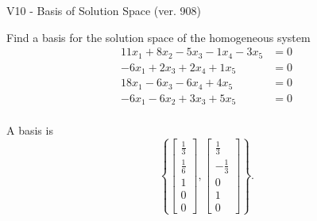 \begin{exercise}
  \begin{exerciseTitle}V10 - Basis of Solution Space (ver. 908)\end{exerciseTitle}
  \begin{exerciseStatement}
    Find a basis for the solution space of the homogeneous system 
\begin{align*}
 11 x_ 1 + 8 x_ 2 -5 x_ 3 -1 x_ 4 -3 x_ 5 &= 0  \\ 
  -6 x_ 1 + 2 x_ 3 + 2 x_ 4 + 1 x_ 5 &= 0  \\ 
  18 x_ 1 -6 x_ 3 -6 x_ 4 + 4 x_ 5 &= 0  \\ 
  -6 x_ 1 -6 x_ 2 + 3 x_ 3 + 5 x_ 5 &= 0  \\ 
 \end{align*}


 
  \end{exerciseStatement}

  \begin{exerciseAnswer}
   A basis is   
\[\left\{\left[\begin{array}{c}
\frac{1}{3} \\
\frac{1}{6} \\
1 \\
0 \\
0
\end{array}\right] , \left[\begin{array}{c}
\frac{1}{3} \\
-\frac{1}{3} \\
0 \\
1 \\
0
\end{array}\right]\right\}.\]

  


  \end{exerciseAnswer}
\end{exercise}
